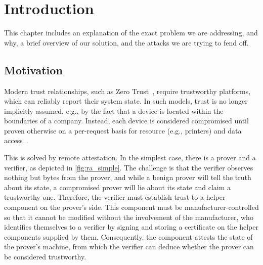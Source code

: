 
\chapter{Introduction}\label{chapter:introduction}

This chapter includes an explanation of the exact problem we are addressing, and why, a brief overview of our solution, and the attacks we are trying to fend off.


\section{Motivation}


Modern trust relationships, such as Zero Trust~\cite{isaca2021}, require trustworthy platforms, which can reliably report their system state.
In such models, trust is no longer implicitly assumed, e.g., by the fact that a device is located within the boundaries of a company.
Instead, each device is considered compromised until proven otherwise on a per-request basis for resource (e.g., printers) and data access~\cite{Rose2020}.


This is solved by remote attestation.
In the simplest case, there is a prover and a verifier, as depicted in \autoref{fig:ra_simple}.
The challenge is that the verifier observes nothing but bytes from the prover, and while a benign prover will tell the truth about its state, a compromised prover will lie about its state and claim a trustworthy one.
Therefore, the verifier must establish trust to a helper component on the prover's side.
This component must be manufacturer-controlled so that it cannot be modified without the involvement of the manufacturer, who identifies themselves to a verifier by signing and storing a certificate on the helper components supplied by them.
Consequently, the component attests the state of the prover's machine, from which the verifier can deduce whether the prover can be considered trustworthy.




